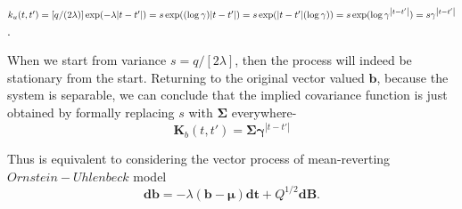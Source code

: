 $k_u(t,t')
  = [q / (2 \lambda)] \exp(-\lambda {\left|t-t'\right|})\\
  = s \exp((\log \gamma) {\left|t-t'\right|})\\
  = s \exp({\left|t-t'\right|}(\log \gamma))\\
  = s \exp(\log \gamma^{\left|t-t'\right|})\\
  = s \gamma^{\left|t-t'\right|}$.

When we start from variance $s = q / \left[2 \lambda\right]$, then the process will indeed be stationary 
from the start. Returning to the original vector valued $\textbf{b}$, because the system is separable, we can 
conclude that the implied covariance function is just obtained by formally replacing $s$ with 
$\boldsymbol{\Sigma}$ everywhere- 
\begin{equation}
\textbf{K}_b(t,t') = \boldsymbol{\Sigma} \boldsymbol{\gamma}^{\left|t-t'\right|}
\end{equation}

Thus is equivalent to considering the vector process of mean-reverting $Ornstein-Uhlenbeck$ model
\begin{equation}
\textbf{db} = -\lambda (\textbf{b} - \boldsymbol{\mu}) \textbf{dt} + Q^{1/2} \textbf{dB}.
\end{equation}